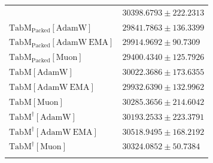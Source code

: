 \begin{longtable}{p{}p{}}
{\begin{tabular}{ll}
{\footnotesize $\mathrm{MLP^\dagger[Muon]}$ } & {\footnotesize$30398.6793 \pm 222.2313$}\\ 
{\footnotesize $\mathrm{TabM_{\text{Packed}}[AdamW]}$ } & {\footnotesize$29841.7863 \pm 136.3399$}\\ 
{\footnotesize $\mathrm{TabM_{\text{Packed}}[AdamW\ EMA]}$ } & {\footnotesize$29914.9692 \pm 90.7309$}\\ 
{\footnotesize $\mathrm{TabM_{\text{Packed}}[Muon]}$ } & {\footnotesize$29400.4340 \pm 125.7926$}\\ 
{\footnotesize $\mathrm{TabM[AdamW]}$ } & {\footnotesize$30022.3686 \pm 173.6355$}\\ 
{\footnotesize $\mathrm{TabM[AdamW\ EMA]}$ } & {\footnotesize$29932.6390 \pm 132.9962$}\\ 
{\footnotesize $\mathrm{TabM[Muon]}$ } & {\footnotesize$30285.3656 \pm 214.6042$}\\ 
{\footnotesize $\mathrm{TabM^\dagger[AdamW]}$ } & {\footnotesize$30193.2533 \pm 223.3791$}\\ 
{\footnotesize $\mathrm{TabM^\dagger[AdamW\ EMA]}$ } & {\footnotesize$30518.9495 \pm 168.2192$}\\ 
{\footnotesize $\mathrm{TabM^\dagger[Muon]}$ } & {\footnotesize$30324.0852 \pm 50.7384$}\\ 
\bottomrule
\end{tabular}}

&

\topalign{
\centering
\setlength\tabcolsep{2.5pt}
\renewcommand{\arraystretch}{0.8}
\begin{tabular}{ll}


\end{tabular}}
\end{longtable}
